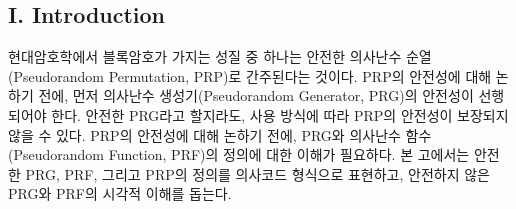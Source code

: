 \documentclass[a0,portrait]{a0poster}
\begin{document}
	\vspace{2.5cm} %
	
	\begin{multicols}{2}
		
		\begin{sectionbox}
			\section*{\LARGE\textcolor{MainColor}{I. Introduction}}\large
			현대암호학에서 블록암호가 가지는 성질 중 하나는 안전한 의사난수 순열(Pseudorandom Permutation, PRP)로 간주된다는 것이다. PRP의 안전성에 대해 논하기 전에, 먼저 의사난수 생성기(Pseudorandom Generator, PRG)의 안전성이 선행되어야 한다. 안전한 PRG라고 할지라도, 사용 방식에 따라 PRP의 안전성이 보장되지 않을 수 있다. PRP의 안전성에 대해 논하기 전에, PRG와 의사난수 함수(Pseudorandom Function, PRF)의 정의에 대한 이해가 필요하다. 본 고에서는 안전한 PRG, PRF, 그리고 PRP의 정의를 의사코드 형식으로 표현하고, 안전하지 않은 PRG와 PRF의 시각적 이해를 돕는다.
		\end{sectionbox}
			
		\begin{sectionbox}

\end{sectionbox}
\end{multicols}
\end{document}
